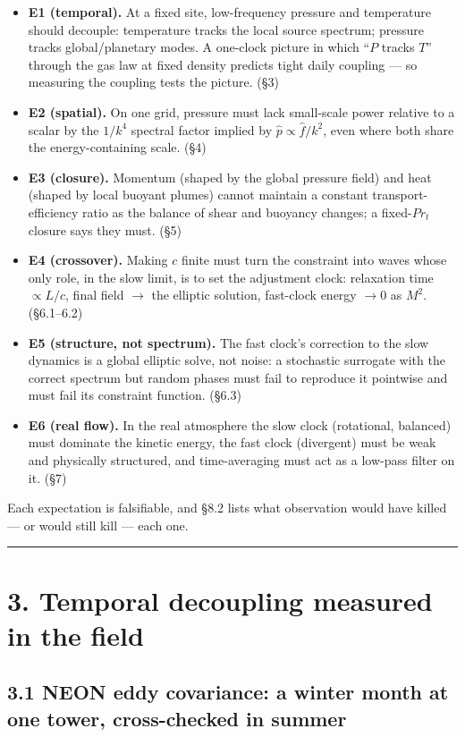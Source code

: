 \documentclass[aps,prfluids,preprint,superscriptaddress,nofootinbib]{revtex4-2}
\begin{document}
\begin{itemize}
\item \textbf{E1 (temporal).} At a fixed site, low-frequency pressure and temperature should decouple: temperature tracks the local source spectrum; pressure tracks global/planetary modes. A one-clock picture in which ``$P$ tracks $T$'' through the gas law at fixed density predicts tight daily coupling --- so measuring the coupling tests the picture. (\S3)
\item \textbf{E2 (spatial).} On one grid, pressure must lack small-scale power relative to a scalar by the $1/k^{4}$ spectral factor implied by $\hat{p}\propto \hat{f}/k^{2}$, even where both share the energy-containing scale. (\S4)
\item \textbf{E3 (closure).} Momentum (shaped by the global pressure field) and heat (shaped by local buoyant plumes) cannot maintain a constant transport-efficiency ratio as the balance of shear and buoyancy changes; a fixed-$Pr_{t}$ closure says they must. (\S5)
\item \textbf{E4 (crossover).} Making $c$ finite must turn the constraint into waves whose only role, in the slow limit, is to set the adjustment clock: relaxation time $\propto L/c$, final field $\to$ the elliptic solution, fast-clock energy $\to 0$ as $M^{2}$. (\S6.1--6.2)
\item \textbf{E5 (structure, not spectrum).} The fast clock's correction to the slow dynamics is a global elliptic solve, not noise: a stochastic surrogate with the correct spectrum but random phases must fail to reproduce it pointwise and must fail its constraint function. (\S6.3)
\item \textbf{E6 (real flow).} In the real atmosphere the slow clock (rotational, balanced) must dominate the kinetic energy, the fast clock (divergent) must be weak and physically structured, and time-averaging must act as a low-pass filter on it. (\S7)
\end{itemize}

Each expectation is falsifiable, and \S8.2 lists what observation would have killed --- or would still kill --- each one.

\medskip\hrule\medskip

\section*{3. Temporal decoupling measured in the field}

\subsection*{3.1 NEON eddy covariance: a winter month at one tower, cross-checked in summer}
\end{document}
